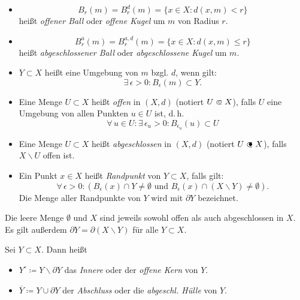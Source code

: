 \documentclass{cheat-sheet}
\newcommand\opn{\mathrel{\ooalign{$\subset$\cr
  \hidewidth\raise.1ex\hbox{$\circ\mkern.5mu$}\cr}}}
\newcommand\cls{\mathrel{\ooalign{$\subset$\cr
  \hidewidth\raise.1ex\hbox{$\bullet\mkern.5mu$}\cr}}}
\begin{document}

\begin{defn}
\begin{itemize}
  \item \[ B_r(m) = B_r^d(m) = \{ x \in X : d(x, m) < r \} \]
  heißt \emph{offener Ball} oder \emph{offene Kugel} um $m$ von Radius $r$.
  \item \[ B_r^a(m) = B_r^{a,d}(m) = \{ x \in X : d(x, m) \le r \} \]
  heißt \emph{abgeschlossener Ball} oder \emph{abgeschlossene Kugel} um $m$.
  \item $Y \subset X$ heißt eine Umgebung von $m$ bzgl. $d$, wenn gilt:
  \[ \exists\,\epsilon > 0 : B_{\epsilon}(m) \subset Y. \]
\end{itemize}
\end{defn}

\begin{defn}
\begin{itemize}
  \item Eine Menge $U \subset X$ heißt \emph{offen} in $(X, d)$ (notiert $U \opn X$), falls $U$ eine Umgebung von allen Punkten $u \in U$ ist, d.\,h.
  \[ \forall\,u \in U : \exists\,\epsilon_u > 0 : B_{\epsilon_u}(u) \subset U \]
  \item Eine Menge $U \subset X$ heißt \emph{abgeschlossen} in $(X, d)$ (notiert $U \cls X$), falls $X \backslash U$ offen ist.
  \item Ein Punkt $x \in X$ heißt \emph{Randpunkt} von $Y \subset X$, falls gilt:
  \[ \forall\,\epsilon > 0 : ( B_{\epsilon}(x) \cap Y \not= \emptyset \text{ und } B_{\epsilon}(x) \cap (X \backslash Y) \not= \emptyset). \]
  Die Menge aller Randpunkte von $Y$ wird mit \emph{$\partial Y$} bezeichnet.
\end{itemize}
\end{defn}

\begin{bem}
Die leere Menge $\emptyset$ und $X$ sind jeweils sowohl offen als auch abgeschlossen in $X$. Es gilt außerdem $\partial Y = \partial (X \backslash Y)$ für alle $Y \subset X$.
\end{bem}

\begin{defn}
Sei $Y \subset X$. Dann heißt
\begin{itemize}
  \item $Y^{\circ} \coloneqq Y \backslash \partial Y$ das \emph{Innere} oder der \emph{offene Kern} von $Y$.
  \item $\overline{Y} \coloneqq Y \cup \partial Y$ der \emph{Abschluss} oder die \emph{abgeschl. Hülle} von $Y$.
\end{itemize}
\end{defn}
\end{document}
